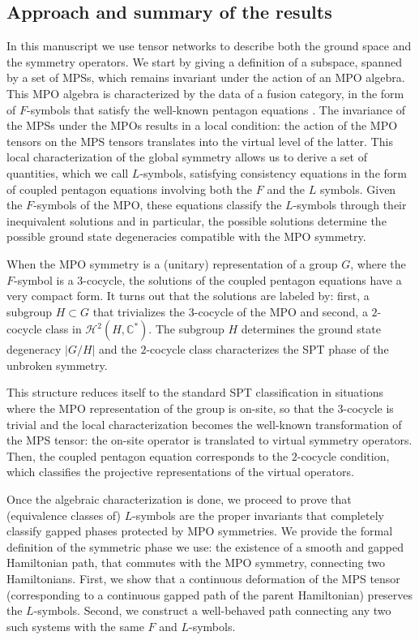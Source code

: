 \documentclass[a4paper,twocolumn,11pt,accepted=2023-02-10]{quantumarticle}
\begin{document}
\subsection*{Approach and summary of the results}

In this manuscript we use tensor networks to describe both the ground space and the symmetry operators. We start by giving a definition of a subspace, spanned by a set of MPSs, which remains invariant under the action of an MPO algebra. This MPO algebra is characterized by the data of a fusion category, in the form of $F$-symbols that satisfy the well-known pentagon equations \cite{Sahinoglu14,Bultinck17A}. The invariance of the MPSs under the MPOs results in a local condition: the action of the MPO tensors on the MPS 
 tensors translates into the virtual level of the latter. This local characterization of the global symmetry allows us to derive a set of quantities, which we call ${L}$-symbols, satisfying consistency equations in the form of coupled pentagon equations involving both the $F$ and the $L$ symbols. Given the ${F}$-symbols of the MPO, these equations classify the ${L}$-symbols through their inequivalent solutions and in particular, the possible solutions determine the possible ground state degeneracies compatible with the MPO symmetry. 

When the MPO symmetry is a (unitary) representation of a group $G$, where the $F$-symbol is a $3$-cocycle, the solutions of the coupled pentagon equations have a very compact form. It turns out that the solutions are labeled by: first, a subgroup $H\subset G$ that trivializes the $3$-cocycle of the MPO and second, a $2$-cocycle class in $\mathcal{H}^2(H,\mathbb{C}^*)$. The subgroup $H$ determines the ground state degeneracy $|G/H|$ and the $2$-cocycle class characterizes the SPT phase of the unbroken symmetry. 

This structure reduces itself to the standard SPT classification in situations where the MPO representation of the group is on-site, so that the $3$-cocycle is trivial and the local characterization becomes the well-known transformation of the MPS tensor: the on-site operator is translated to virtual symmetry operators. Then, the coupled pentagon equation corresponds to the $2$-cocycle condition, which classifies the projective representations of the virtual operators. 

Once the algebraic characterization is done, we proceed to prove that (equivalence classes of) ${L}$-symbols are the proper invariants that completely classify gapped phases protected by MPO symmetries. We provide the formal definition of the symmetric phase we use: the existence of a smooth and gapped Hamiltonian path, that commutes with the MPO symmetry, connecting two Hamiltonians. First, we show that a continuous deformation of the MPS tensor (corresponding to a continuous gapped path of the parent Hamiltonian) preserves the ${L}$-symbols. Second, we construct a well-behaved path connecting any two such systems with the same $F$ and $L$-symbols.
\end{document}
